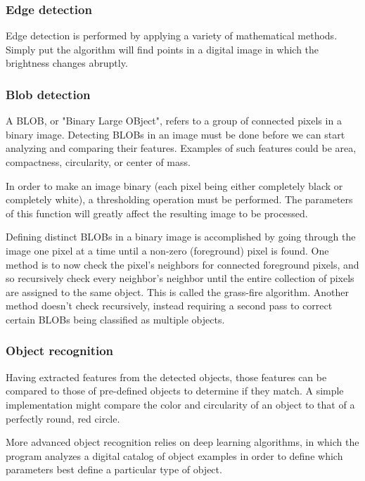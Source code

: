 \subsubsection{Edge detection}

Edge detection is performed by applying a variety of mathematical methods. Simply put the algorithm will find points in a digital image in which the brightness changes abruptly. 

\subsubsection{Blob detection}

A BLOB, or "Binary Large OBject", refers to a group of connected pixels in a binary image. Detecting BLOBs in an image must be done before we can start analyzing and comparing their features. Examples of such features could be area, compactness, circularity, or center of mass.

In order to make an image binary (each pixel being either completely black or completely white), a thresholding operation must be performed. The parameters of this function will greatly affect the resulting image to be processed. 

Defining distinct BLOBs in a binary image is accomplished by going through the image one pixel at a time until a non-zero (foreground) pixel is found. One method is to now check the pixel's neighbors for connected foreground pixels, and so recursively check every neighbor's neighbor until the entire collection of pixels are assigned to the same object. This is called the grass-fire algorithm. Another method doesn't check recursively, instead requiring a second pass to correct certain BLOBs being classified as multiple objects.


\subsubsection{Object recognition}
Having extracted features from the detected objects, those features can be compared to those of pre-defined objects to determine if they match. A simple implementation might compare the color and circularity of an object to that of a perfectly round, red circle. 

More advanced object recognition relies on deep learning algorithms, in which the program analyzes a digital catalog of object examples in order to define which parameters best define a particular type of object.


